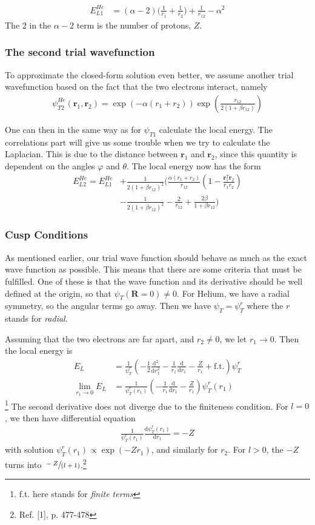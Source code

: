 \documentclass[twocolumns, a4paper,11pt,fleqn]{extarticle}
\newcommand{\eq}[1]{{\small\begin{align*}#1\end{align*}}}
\renewcommand\vec[1]{\boldsymbol{\mathbf{#1}}}
\begin{document}
\eq{
  E_{L1}^{He}
  &=(\alpha-2)\bigg( \frac{1}{r_1}+\frac{1}{r_2} \bigg)
    +\frac{1}{r_{12}}-\alpha^2
}
The $2$ in the $\alpha-2$ term is the number of protons, $Z$.

\subsubsection{The second trial wavefunction}
To approximate the closed-form solution even better,
we assume another trial wavefunction based on the fact that
the two electrons interact, namely
\eq{
  \psi_{T2}^{He} (\vec r_1,\vec r_2)
    =\exp{\left(-\alpha(r_1+r_2)\right)}
    \exp{\left(\frac{r_{12}}{2(1+\beta r_{12})}\right)}
}

One can then in the same way as for $\psi_{T1}$ calculate
the local energy. The correlations part will give us some trouble
when we try to calculate the Laplacian. This is due to
the distance between $\vec r_1$ and $\vec r_2$, since this quantity
is dependent on the angles $\varphi$ and $\theta$.
The local energy now has the form
\eq{
	E_{L2}^{He} = E_{L1}^{He}&+\frac{1}{2(1+\beta r_{12})^2}
	\bigg(\frac{\alpha(r_1+r_2)}{r_{12}}(1-
	\frac{\mathbf{r}_1^T\mathbf{r}_2}{r_1r_2})\\
	&-\frac{1}{2(1+\beta r_{12})^2}-\frac{2}{r_{12}}+
	\frac{2\beta}{1+\beta r_{12}}\bigg)
}

\subsubsection{Cusp Conditions}
As mentioned earlier, our trial wave function should behave as much
as the exact wave function as possible.
This means that there are some criteria that must be fulfilled.
One of these is that the wave function and its derivative
should be well defined at the origin,
so that $\psi_T(\vec R = 0)\neq 0$.
For Helium, we have a radial symmetry, so the angular terms go away.
Then we have $\psi_T = \psi_T^r$ where the $r$ stands for \textit{radial}.

Assuming that the two electrons are far apart, and $r_2 \neq 0$,
we let $r_1 \rightarrow 0$. Then the local energy is
\eq{E_L &=
  \frac{1}{\psi_T^{r}}\left( -\frac{1}{2}\frac{\mathrm d^2}{\mathrm d r_1^2}
  - \frac{1}{r_1}\frac{\mathrm d}{\mathrm d r_1} - \frac{Z}{r_1} + \text{f.t.}
  \right)\psi_T^{r}\\
  \lim_{r_1\rightarrow 0} E_L &=\frac{1}{\psi_T^{r}(r_1)}
  \left(- \frac{1}{r_1}\frac{\mathrm d}{\mathrm d r_1} 
  - \frac{Z}{r_1}\right)\psi_T^{r}(r_1)
}\footnote{f.t. here stands for \textit{finite terms}}
The second derivative does not diverge due to the finiteness condition.
For $l=0$, we then have differential equation
\eq{
  \frac{1}{\psi_T^{r}(r_1)}\frac{\mathrm d \psi_T^{r}(r_1)}{\mathrm d r_1}
  = -Z
}
with solution $\psi_T^{r}(r_1) \propto \exp(-Zr_1)$, and similarly for $r_2$.
For $l>0$, the $-Z$ turns into $\sfrac{-Z}{(l+1)}$.\footnote{Ref. [1], p. 477-478}
\end{document}
